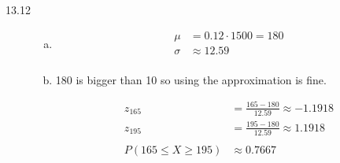 \documentclass[landscape]{exam}
\begin{document}
\begin{description}
    \item[13.12]
      \begin{enumerate}[(a)]
        \item 
          \begin{align*}
            \mu    & = 0.12 \cdot 1500 = 180 \\
            \sigma & \approx 12.59 \\
          \end{align*}

        \item
          180 is bigger than 10 so using the approximation is fine.

          \begin{align*}
            z_{165} & = \frac{165 - 180}{12.59} \approx -1.1918 \\
            z_{195} & = \frac{195 - 180}{12.59} \approx 1.1918 \\
            \\
            P(165 \leq X \geq 195) & \approx 0.7667 \\
          \end{align*}

      \end{enumerate}


  \end{description}
\end{document}
